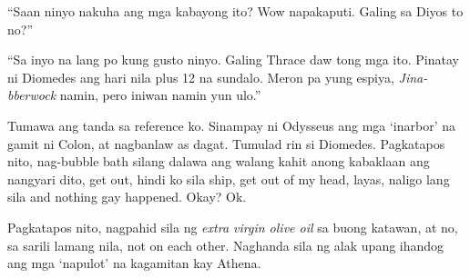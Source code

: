\documentclass[12pt,letterpaper]{report}
\begin{document}
``Saan ninyo nakuha ang mga kabayong ito? Wow napakaputi. Galing sa Diyos to no?''

``Sa inyo na lang po kung gusto ninyo. Galing Thrace daw tong mga ito. Pinatay ni Diomedes ang hari nila plus 12 na sundalo. Meron pa yung espiya, \textit{Jina-bberwock} namin, pero iniwan namin yun ulo.''

Tumawa ang tanda sa reference ko. Sinampay ni Odysseus ang mga `inarbor' na gamit ni Colon, at nagbanlaw as dagat. Tumulad rin si Diomedes. Pagkatapos nito, nag-bubble bath silang dalawa ang walang kahit anong kabaklaan ang nangyari dito, get out, hindi ko sila ship, get out of my head, layas, naligo lang sila and nothing gay happened. Okay? Ok.

Pagkatapos nito, nagpahid sila ng \textit{extra virgin olive oil} sa buong katawan, at no, sa sarili lamang nila, not on each other. Naghanda sila ng alak upang ihandog ang mga `napulot' na kagamitan kay Athena.

\pagebreak
\end{document}
